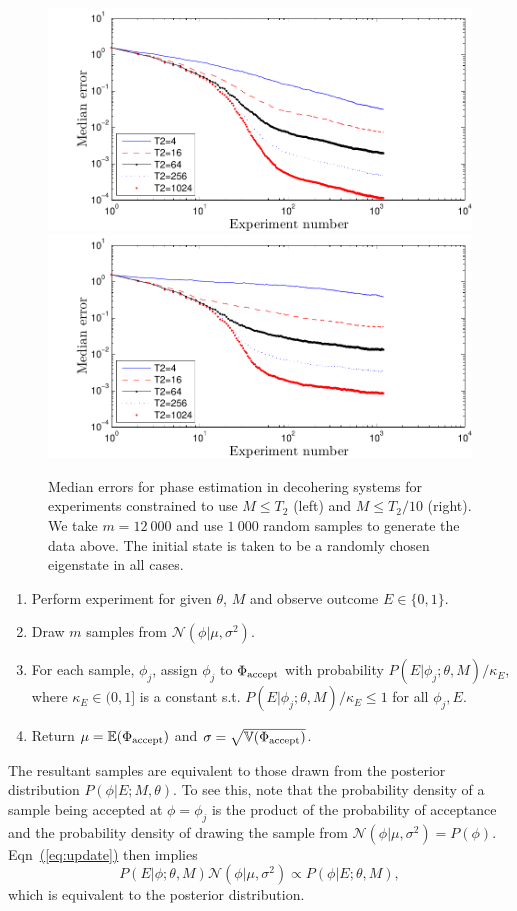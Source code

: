 \documentclass[aps,pra,amsmath,twocolumn,amssymb,superscriptaddress]{revtex4-1}
\newcommand{\eq}[1]{\hyperref[eq:#1]{(\ref*{eq:#1})}}
\begin{document}
\begin{figure}
    \begin{centering}
\includegraphics[width=0.45\linewidth]{T2plot_full.pdf}
        \includegraphics[width=0.45\linewidth]{T2plot.pdf}
    \end{centering}
    \caption{\label{fig:T2plot}
Median errors for phase estimation in decohering systems for experiments constrained to use $M\le T_2$ (left) and $M\le T_2/10$ (right).  We take $m=12~000$ and use $1~000$ random samples to generate the data above.  The initial state is taken to be a randomly chosen eigenstate in all cases.
    }
\end{figure}



\begin{enumerate}
\item Perform experiment for given $\theta$, $M$ and observe outcome $E\in \{0,1\}$.
\item Draw $m$ samples from $\mathcal{N}(\phi|\mu,\sigma^2)$.
\item For each sample, $\phi_j$, assign $\phi_j$ to $\Phi_{\rm accept}$ with probability $P(E|\phi_j;\theta,M)/\kappa_E$, where $\kappa_E\in (0,1]$ is a constant s.t. $P(E|\phi_j;\theta,M)/\kappa_E\le 1$ for all $\phi_j,E$.
\item Return $\mu = \mathbb{E}(\Phi_{\rm accept})$ and $\sigma =\sqrt{\mathbb{V}(\Phi_{\rm accept})}$.
\end{enumerate}

The resultant samples are equivalent to those drawn from the posterior distribution
$P(\phi|E;M,\theta)$.  To see this, note that the probability density of a sample being accepted at $\phi=\phi_j$ is the product of the probability of acceptance and the probability density of drawing the sample from $\mathcal{N}(\phi|\mu,\sigma^2)=P(\phi)$.  Eqn~\eq{update} then implies 
\begin{equation}
    P(E | \phi; \theta, M) \mathcal{N}(\phi|\mu,\sigma^2) \propto P(\phi | E; \theta, M),
\end{equation}
which is equivalent to the posterior distribution.  
\end{document}
